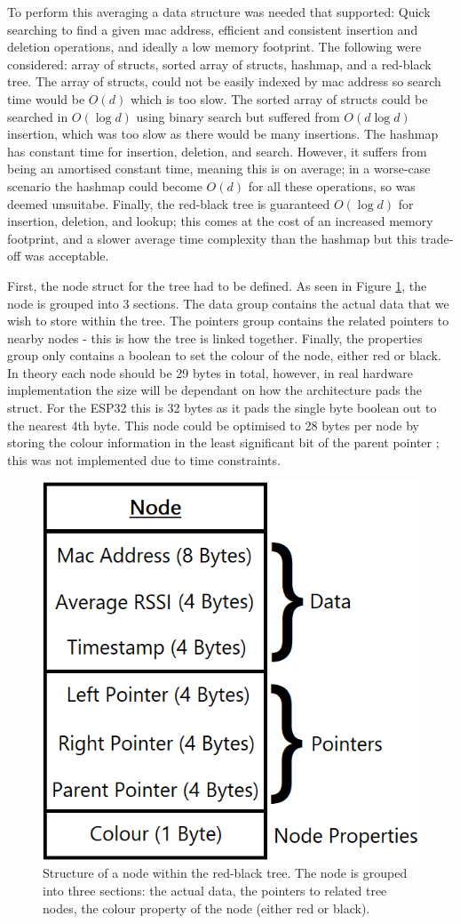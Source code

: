 \documentclass{l4proj}
\begin{document}
To perform this averaging a data structure was needed that supported: Quick searching to find a given mac address, efficient and consistent insertion and deletion operations, and ideally a low memory footprint. The following were considered: array of structs, sorted array of structs, hashmap, and a red-black tree. The array of structs, could not be easily indexed by mac address so search time would be $O(d)$ which is too slow. The sorted array of structs could be searched in $O(\log{d})$ using binary search but suffered from $O(d\log{d})$ insertion, which was too slow as there would be many insertions. The hashmap has constant time for insertion, deletion, and search. However, it suffers from being an amortised constant time, meaning this is on average; in a worse-case scenario the hashmap could become $O(d)$ for all these operations, so was deemed unsuitabe. Finally, the red-black tree is guaranteed $O(\log{d})$ for insertion, deletion, and lookup; this comes at the cost of an increased memory footprint, and a slower average time complexity than the hashmap but this trade-off was acceptable.

First, the node struct for the tree had to be defined. As seen in Figure \ref{fig:tree_node}, the node is grouped into 3 sections. The data group contains the actual data that we wish to store within the tree. The pointers group contains the related pointers to nearby nodes - this is how the tree is linked together. Finally, the properties group only contains a boolean to set the colour of the node, either red or black. In theory each node should be 29 bytes in total, however, in real hardware implementation the size will be dependant on how the architecture pads the struct. For the ESP32 this is 32 bytes as it pads the single byte boolean out to the nearest 4th byte. This node could be optimised to 28 bytes per node by storing the colour information in the least significant bit of the parent pointer \citep{munoz_bannalia_2008}; this was not implemented due to time constraints.

\begin{figure}[!htb]
    \centering
    \includegraphics[width=0.4\linewidth]{images/rbtree_node.png}

    \caption{ Structure of a node within the red-black tree. The node is grouped into three sections: the actual data, the pointers to related tree nodes, the colour property of the node (either red or black). }

    \label{fig:tree_node}
\end{figure}
\end{document}
